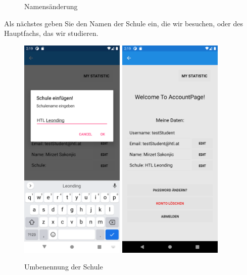 \begin{figure}[h]
\begin{center}
    \caption[MyAccount]{Namensänderung}
    \end{center}
\end{figure}
\newpage
Als nächstes geben Sie den Namen der Schule ein, die wir besuchen, oder des Hauptfachs, das wir studieren.
\begin{figure}[h]
    \begin{center}
    \includegraphics[width=5cm]{pics/Xamarin Student/17 School.png}\hfill
    \includegraphics[width=5cm]{pics/Xamarin Student/18 School success.png}
    \caption[MyAccount]{Umbenennung der Schule}
    \end{center}
\end{figure}
